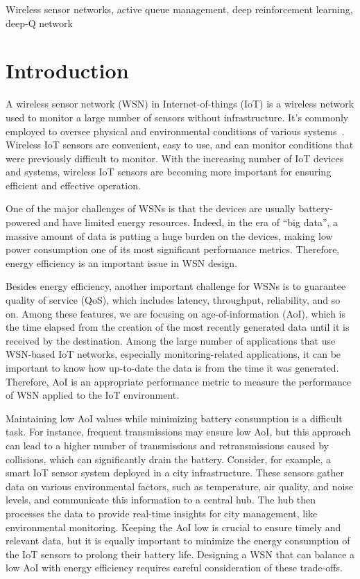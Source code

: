 \documentclass[journal]{IEEEtran}
\begin{document}
\begin{IEEEkeywords}
Wireless sensor networks, active queue management, deep reinforcement learning, deep-Q network
\end{IEEEkeywords}


\IEEEpeerreviewmaketitle



\section{Introduction}
\label{sec:introduction}

A wireless sensor network (WSN) in Internet-of-things (IoT) is a wireless network used to monitor a large number of sensors without infrastructure. It's commonly employed to oversee physical and environmental conditions of various systems~\cite{Lazarescu2013}. Wireless IoT sensors are convenient, easy to use, and can monitor conditions that were previously difficult to monitor. With the increasing number of IoT devices and systems, wireless IoT sensors are becoming more important for ensuring efficient and effective operation.

One of the major challenges of WSNs is that the devices are usually battery-powered and have limited energy resources. Indeed, in the era of ``big data'', a massive amount of data is putting a huge burden on the devices, making low power consumption one of its most significant performance metrics. Therefore, energy efficiency is an important issue in WSN design.

Besides energy efficiency, another important challenge for WSNs is to guarantee quality of service (QoS), which includes latency, throughput, reliability, and so on. Among these features, we are focusing on age-of-information (AoI), which is the time elapsed from the creation of the most recently generated data until it is received by the destination. Among the large number of applications that use WSN-based IoT networks, especially monitoring-related applications, it can be important to know how up-to-date the data is from the time it was generated. Therefore, AoI is an appropriate performance metric to measure the performance of WSN applied to the IoT environment.

Maintaining low AoI values while minimizing battery consumption is a difficult task. For instance, frequent transmissions may ensure low AoI, but this approach can lead to a higher number of transmissions and retransmissions caused by collisions, which can significantly drain the battery. Consider, for example, a smart IoT sensor system deployed in a city infrastructure. These sensors gather data on various environmental factors, such as temperature, air quality, and noise levels, and communicate this information to a central hub. The hub then processes the data to provide real-time insights for city management, like environmental monitoring. Keeping the AoI low is crucial to ensure timely and relevant data, but it is equally important to minimize the energy consumption of the IoT sensors to prolong their battery life. Designing a WSN that can balance a low AoI with energy efficiency requires careful consideration of these trade-offs.
\end{document}
